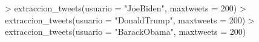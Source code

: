 
\begin{Schunk}
\begin{Sinput}
>   extraccion_tweets(usuario  = "JoeBiden", maxtweets  = 200)
>   extraccion_tweets(usuario  = "DonaldTrump", maxtweets  = 200)
>   extraccion_tweets(usuario  = "BarackObama", maxtweets  = 200)
\end{Sinput}
\end{Schunk}
